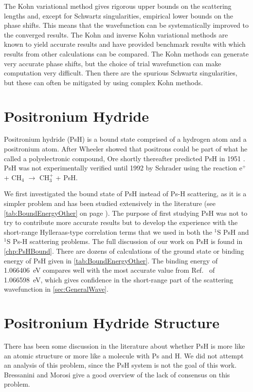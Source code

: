 \documentclass[Dissertation.tex]{subfiles}
\begin{document}
The Kohn variational method gives rigorous upper bounds on the scattering 
lengths and, except for Schwartz singularities, empirical lower bounds on the 
phase shifts. This means that the wavefunction can be systematically 
improved to the converged results. The Kohn and inverse Kohn variational 
methods are known to yield accurate results and have provided benchmark 
results \cite{VanReeth2003,VanReeth2004} with which results from other 
calculations can be compared. The Kohn methods can generate very accurate 
phase shifts, but the choice of trial wavefunction can make computation very 
difficult. Then there are the spurious Schwartz singularities, but these can 
often be mitigated by using complex Kohn methods.


\section{Positronium Hydride}
\label{sec:PsH}
Positronium hydride (PsH) is a bound state comprised of 
a hydrogen atom and a positronium atom. After Wheeler \cite{Wheeler1946} 
showed that positrons could be part of what he called a polyelectronic 
compound, Ore shortly thereafter predicted PsH in 1951 \cite{Ore1951}. PsH 
was not experimentally verified until 1992 by Schrader \cite{Schrader1992}
using the reaction e$^+$ + CH$_4$ $\to$ CH$_3^+$ + PsH.

We first investigated the bound state of PsH instead of Ps-H scattering, as 
it is a simpler problem and has been studied extensively in the literature
(see \cref{tab:BoundEnergyOther} on page \pageref{tab:BoundEnergyOther}).
The purpose of first studying PsH was not to try to contribute more accurate
results but to develop the experience with the short-range Hylleraas-type 
correlation terms that we used in both the $^1$S PsH and $^1$S Ps-H
scattering problems. 
The full discussion of our work on PsH is found in \cref{chp:PsHBound}.
There are dozens of calculations of the ground state
or binding energy of PsH given in \cref{tab:BoundEnergyOther}.
The binding energy of \SI{1.066 406}{eV} compares well with the most accurate
value from Ref.~\cite{Bubin2006} of \SI{1.066 598}{eV}, which gives confidence
in the short-range part of the scattering wavefunction in
\cref{sec:GeneralWave}.



\section{Positronium Hydride Structure}
\label{sec:PsHStructure}
There has been some discussion in the literature about whether PsH is more 
like an atomic structure or more like a molecule with Ps and H. We did not 
attempt an analysis of this problem, since the PsH system is not the goal of 
this work. Bressanini and Morosi \cite{Bressanini2003} give a good overview 
of the lack of consensus on this problem. 
\end{document}
